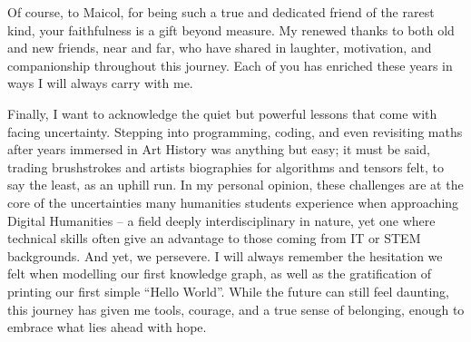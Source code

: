 \begin{spacing}{1.5}
Of course, to Maicol, for being such a true and dedicated friend of the rarest kind, your faithfulness is a gift beyond measure. My renewed thanks to both old and new friends, near and far, who have shared in laughter, motivation, and companionship throughout this journey. Each of you has enriched these years in ways I will always carry with me.

Finally, I want to acknowledge the quiet but powerful lessons that come with facing uncertainty. Stepping into programming, coding, and even revisiting maths after years immersed in Art History was anything but easy; it must be said, trading brushstrokes and artists biographies for algorithms and tensors felt, to say the least, as an uphill run. In my personal opinion, these challenges are at the core of the uncertainties many humanities students experience when approaching Digital Humanities -- a field deeply interdisciplinary in nature, yet one where technical skills often give an advantage to those coming from IT or STEM backgrounds. And yet, we persevere. I will always remember the hesitation we felt when modelling our first knowledge graph, as well as the gratification of printing our first simple ``Hello World''. While the future can still feel daunting, this journey has given me tools, courage, and a true sense of belonging, enough to embrace what lies ahead with hope.

\end{spacing}